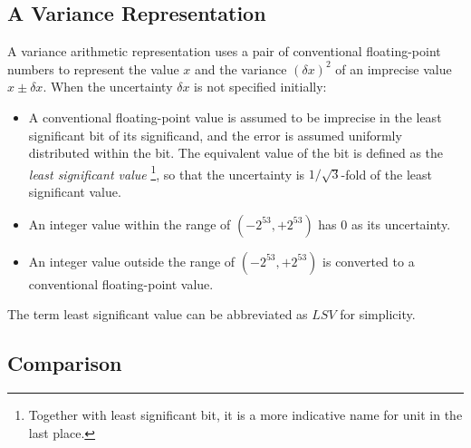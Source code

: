\documentclass[twoside]{article}
\numberwithin{equation}{section}
\begin{document}
\subsection{A Variance Representation}

A variance arithmetic representation uses a pair of conventional floating-point numbers to represent the value $x$ and the variance $(\delta x)^2$ of an imprecise value $x \pm \delta x$.
When the uncertainty $\delta x$ is not specified initially:
\begin{itemize}
\item A conventional floating-point value is assumed to be imprecise in the least significant bit of its significand, and the error is assumed uniformly distributed within the bit.
The equivalent value of the bit is defined as the \emph{least significant value} \footnote{Together with least significant bit, it is a more indicative name for unit in the last place.}, so that the uncertainty is $1/\sqrt{3}$-fold of the least significant value.

\item An integer value within the range of $(-2^{53}, +2^{53})$ has 0 as its uncertainty.

\item An integer value outside the range of $(-2^{53}, +2^{53})$ is converted to a conventional floating-point value.
\end{itemize}

The term least significant value can be abbreviated as $LSV$ for simplicity.

\subsection{Comparison}

\iffalse
\end{document}
